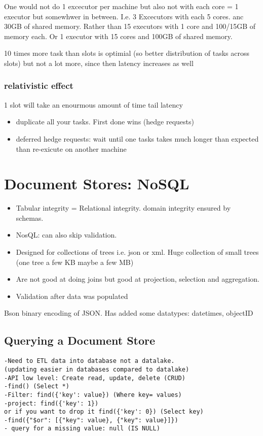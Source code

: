 One would not do 1 excecutor per machine but also not with each core = 1 executor but somewhwer in between.
I.e. 3 Excecutors with each 5 cores. anc 30GB of shared memory.
Rather than 15 executors with 1 core and 100/15GB of memory each.
Or 1 executor with 15 cores and 100GB of shared memory.

10 times more task than slots is optimial (so better distribution of tasks across slots) but not a lot more, since then latency increases as well

\subsubsection{relativistic effect}
1 slot will take an enourmous amount of time \textrightarrow tail latency
\begin{itemize}
    \item duplicate all your tasks. First done wins (hedge requests)
    \item deferred hedge requests: wait until one tasks takes much longer than expected than re-exicute on another machine
\end{itemize}



\section{Document Stores: NoSQL}
\begin{itemize}
    \item Tabular integrity = Relational integrity. domain integrity ensured by schemas.
    \item NosQL: can also  skip validation.
    \item Designed for collections of trees i.e. json or xml. Huge collection of small trees (one tree a few KB maybe a few MB)
    \item Are not good at doing joins but good at projection, selection and aggregation.
    \item Validation after data was populated
\end{itemize}

Bson binary encoding of JSON. Has added some datatypes: datetimes, objectID

\subsection{Querying a Document Store}


\begin{lstlisting}
-Need to ETL data into database not a datalake.
(updating easier in databases compared to datalake)
-API low level: Create read, update, delete (CRUD)
-find() (Select *)
-Filter: find({'key': value}) (Where key= values)
-project: find({'key': 1})
or if you want to drop it find({'key': 0}) (Select key)
-find({"$or": [{"key": value}, {"key": value}]})
- query for a missing value: null (IS NULL)
\end{lstlisting}


